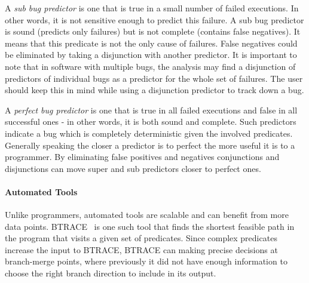 A \emph{sub bug predictor} is one that is true in a small number of failed executions.  In other words, it is not sensitive enough to predict this failure.  A sub bug predictor is sound (predicts only failures) but is not complete (contains false negatives).  It means that this predicate is not the only cause of failures.  False negatives could be eliminated by taking a disjunction with another predictor.  It is important to note that in software with multiple bugs, the analysis may find a disjunction of predictors of individual bugs as a predictor for the whole set of failures.  The user should keep this in mind while using a disjunction predictor to track down a bug.

A \emph{perfect bug predictor} is one that is true in all failed executions and false in all successful ones - in other words, it is both sound and complete.  Such predictors indicate a bug which is completely deterministic given the involved predicates.  Generally speaking the closer a predictor is to perfect the more useful it is to a programmer.  By eliminating false positives and negatives conjunctions and disjunctions can move super and sub predictors closer to perfect ones.

\paragraph{Automated Tools}

Unlike programmers, automated tools are scalable and can benefit from more data points.  BTRACE~\cite{Lal:2006:POPAD} is one such tool that finds the shortest feasible path in the program that visits a given set of predicates.  Since complex predicates increase the input to BTRACE, BTRACE can making precise decisions at branch-merge points, where previously it did not have enough information to choose the right branch direction to include in its output.
